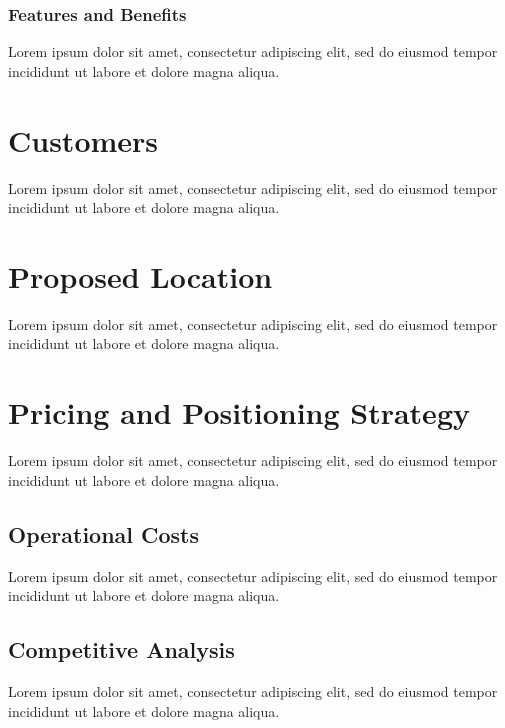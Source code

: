 \subsubsection*{Features and Benefits}

Lorem ipsum dolor sit amet, consectetur adipiscing elit, sed do eiusmod tempor incididunt ut labore et dolore magna aliqua.


\section{Customers}

Lorem ipsum dolor sit amet, consectetur adipiscing elit, sed do eiusmod tempor incididunt ut labore et dolore magna aliqua.


\section{Proposed Location}

Lorem ipsum dolor sit amet, consectetur adipiscing elit, sed do eiusmod tempor incididunt ut labore et dolore magna aliqua.


\section{Pricing and Positioning Strategy}

Lorem ipsum dolor sit amet, consectetur adipiscing elit, sed do eiusmod tempor incididunt ut labore et dolore magna aliqua.

\subsection{Operational Costs}

Lorem ipsum dolor sit amet, consectetur adipiscing elit, sed do eiusmod tempor incididunt ut labore et dolore magna aliqua.

\subsection{Competitive Analysis}

Lorem ipsum dolor sit amet, consectetur adipiscing elit, sed do eiusmod tempor incididunt ut labore et dolore magna aliqua.

